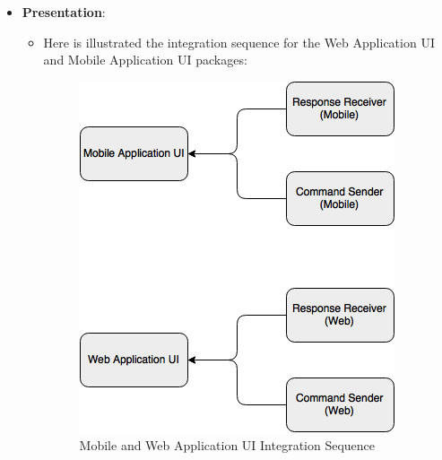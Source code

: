 \documentclass[../../../../../../testPlan.tex]{subfiles}
\begin{document}
\begin{itemize}
			\item \textbf{Presentation}:
					\begin{itemize}
						\item Here is illustrated the integration sequence for the Web Application UI and Mobile Application UI packages:
							\begin{figure}[H]
								\centering
								\includegraphics[width=\textwidth, scale=0.5]{../images/priority_presentation.png}
								\caption{Mobile and Web Application UI Integration Sequence}\label{fig:UISequence}
							\end{figure}
					\end{itemize}
		\end{itemize}
	
	 
\end{document}
